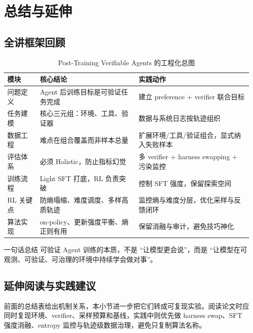 \section{总结与延伸}

\subsection{全讲框架回顾}

\begin{table}[H]
\centering
\begin{tabular}{p{2.6cm}p{4.2cm}p{4.1cm}}
\toprule
\textbf{模块} & \textbf{核心结论} & \textbf{实践动作} \\
\midrule
问题定义 & Agent 后训练目标是可验证任务完成 & 建立 preference + verifier 联合目标 \\
任务建模 & 核心三元组：环境、工具、验证器 & 数据与系统日志按轨迹组织 \\
数据工程 & 难点在组合覆盖而非样本总量 & 扩展环境/工具/验证组合，显式纳入失败样本 \\
评估体系 & 必须 Holistic，防止指标幻觉 & 多 verifier + harness swapping + 污染监控 \\
训练流程 & Light SFT 打底，RL 负责突破 & 控制 SFT 强度，保留探索空间 \\
RL 关键点 & 防熵塌缩、难度调度、多样高质轨迹 & 监控熵与难度分层，优化采样与反馈闭环 \\
算法实现 & on-policy、更新强度平衡、熵正则有用 & 保留消融与审计，避免技巧神化 \\
\bottomrule
\end{tabular}
\caption{Post-Training Verifiable Agents 的工程化总图}
\end{table}

\begin{importantbox}{一句话总结}
可验证 Agent 训练的本质，不是 ``让模型更会说''，而是 ``让模型在可观测、可验证、可治理的环境中持续学会做对事''。
\end{importantbox}

\subsection{延伸阅读与实践建议}

前面的总结表给出机制关系，本小节进一步把它们转成可复现实验。阅读论文时应同时复现环境、verifier、采样预算和基线，实践中则优先做 harness swap、SFT 强度消融、entropy 监控与轨迹级数据治理，避免只复制算法名称。

